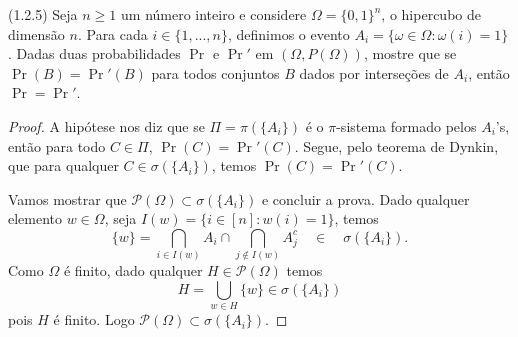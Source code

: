 \begin{exercise}
	(1.2.5)
	Seja $n \geq 1$ um número inteiro e considere $\Omega= \{0, 1\}^n$,
	o hipercubo
	de dimensão $n$.
	Para cada $i \in \{1, . . . , n\}$, definimos o evento $A_i =
	\{\omega \in \Omega : \omega(i) = 1\}$. Dadas
	duas probabilidades $\Pr$ e $\Pr '$ em $(\Omega, P(\Omega))$,
	mostre que se $\Pr(B) = \Pr'(B)$ para todos
	conjuntos $B$ dados por interseções de $A_i$, então $\Pr = \Pr'$.
\end{exercise}
\begin{proof}


	A hipótese nos diz que se $\Pi = \pi(\{A_i\})$ é o $\pi$-sistema
	formado pelos $A_i$'s, então para todo $C \in \Pi$, $\Pr(C) =
	\Pr'(C)$. Segue, pelo teorema de Dynkin, que para qualquer
	$C \in \sigma(\{A_i\})$, temos $\Pr(C) = \Pr'(C)$.

	Vamos mostrar que $\mathcal{P}(\Omega) \subset \sigma(\{A_i\})$ e concluir a
	prova. Dado qualquer elemento $w \in \Omega$,
	seja $I(w) = \{i \in [n] : w(i) = 1\}$, temos
	\[
		\{w\} = \bigcap_{i \in I(w)} A_i \cap \bigcap_{j \not \in I(w)}
		A_j^c \quad \in\quad  \sigma(\{A_i\}).
	\]
	Como $\Omega$ é finito, dado qualquer $H \in \mathcal{P}(\Omega)$ temos
	\[
		H = \bigcup_{w \in H} \{w\} \in \sigma(\{A_i\})
	\] pois $H$ é finito. Logo $\mathcal{P}(\Omega) \subset \sigma(\{A_i\})$.
\end{proof}

